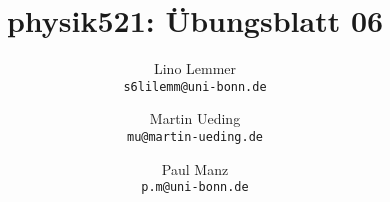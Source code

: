 

\setcounter{section}{0}
\renewcommand\thesection{H\,6.\arabic{section}}
\renewcommand\thesubsection{\thesection.\alph{subsection}}

\title{physik521: Übungsblatt 06}
\author{%
    Lino Lemmer \\ \small{\texttt{s6lilemm@uni-bonn.de}}
    \and
    Martin Ueding \\ \small{\texttt{mu@martin-ueding.de}}
    \and
    Paul Manz \\ \small{\texttt{p.m@uni-bonn.de}}
}


\maketitle

